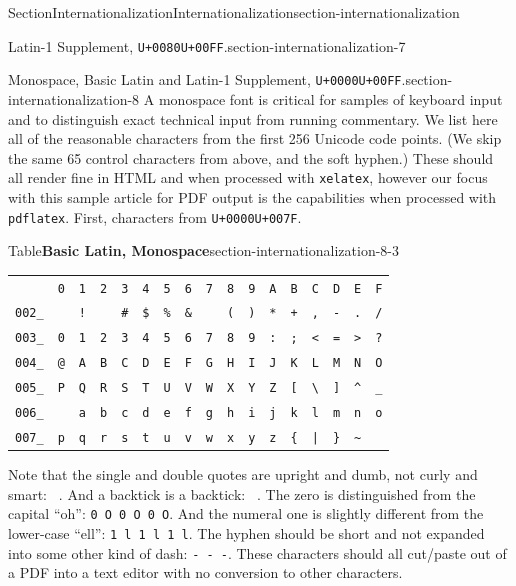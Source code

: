\documentclass[twoside,10pt,]{article}
\newcommand{\tabularfont}{\relax}
\newcommand{\mono}[1]{\texttt{#1}}
\numberwithin{equation}{section}
\begin{document}
\begin{sectionptx}{Section}{Internationalization}{}{Internationalization}{}{}{section-internationalization}
\begin{paragraphs}{Latin-1 Supplement, \mono{U+0080}\textendash{}\mono{U+00FF}.}{section-internationalization-7}
\end{paragraphs}%
\begin{paragraphs}{Monospace, Basic Latin and Latin-1 Supplement, \mono{U+0000}\textendash{}\mono{U+00FF}.}{section-internationalization-8}%
A monospace font is critical for samples of keyboard input and to distinguish exact technical input from running commentary.  We list here all of the reasonable characters from the first 256 Unicode code points.  (We skip the same 65 control characters from above, and the soft hyphen.)  These should all render fine in HTML and when processed with \mono{xelatex}, however our focus with this sample article for PDF output is the capabilities when processed with \mono{pdflatex}.  First, characters from \mono{U+0000}\textendash{}\mono{U+007F}.%
\begin{tableptx}{Table}{\textbf{Basic Latin, Monospace}}{section-internationalization-8-3}{}%
\centering%
{\tabularfont%
\begin{tabular}{lllllllllllllllll}
&\mono{0}&\mono{1}&\mono{2}&\mono{3}&\mono{4}&\mono{5}&\mono{6}&\mono{7}&\mono{8}&\mono{9}&\mono{A}&\mono{B}&\mono{C}&\mono{D}&\mono{E}&\mono{F}\tabularnewline[0pt]
\mono{002\_}&\mono{ }&\mono{!}&\mono{\textquotedbl{}}&\mono{\#}&\mono{\$}&\mono{\%}&\mono{\&}&\mono{\textquotesingle{}}&\mono{(}&\mono{)}&\mono{*}&\mono{+}&\mono{,}&\mono{-}&\mono{.}&\mono{/}\tabularnewline[0pt]
\mono{003\_}&\mono{0}&\mono{1}&\mono{2}&\mono{3}&\mono{4}&\mono{5}&\mono{6}&\mono{7}&\mono{8}&\mono{9}&\mono{:}&\mono{;}&\mono{<}&\mono{=}&\mono{>}&\mono{?}\tabularnewline[0pt]
\mono{004\_}&\mono{@}&\mono{A}&\mono{B}&\mono{C}&\mono{D}&\mono{E}&\mono{F}&\mono{G}&\mono{H}&\mono{I}&\mono{J}&\mono{K}&\mono{L}&\mono{M}&\mono{N}&\mono{O}\tabularnewline[0pt]
\mono{005\_}&\mono{P}&\mono{Q}&\mono{R}&\mono{S}&\mono{T}&\mono{U}&\mono{V}&\mono{W}&\mono{X}&\mono{Y}&\mono{Z}&\mono{[}&\mono{\textbackslash{}}&\mono{]}&\mono{\textasciicircum{}}&\mono{\_}\tabularnewline[0pt]
\mono{006\_}&\mono{\textasciigrave{}}&\mono{a}&\mono{b}&\mono{c}&\mono{d}&\mono{e}&\mono{f}&\mono{g}&\mono{h}&\mono{i}&\mono{j}&\mono{k}&\mono{l}&\mono{m}&\mono{n}&\mono{o}\tabularnewline[0pt]
\mono{007\_}&\mono{p}&\mono{q}&\mono{r}&\mono{s}&\mono{t}&\mono{u}&\mono{v}&\mono{w}&\mono{x}&\mono{y}&\mono{z}&\mono{\{}&\mono{|}&\mono{\}}&\mono{\textasciitilde{}}&
\end{tabular}
}%
\end{tableptx}%
Note that the single and double quotes are upright and dumb, not curly and smart: \mono{\textquotesingle{} \textquotedbl{} \textquotesingle{} \textquotedbl{} \textquotesingle{} \textquotedbl{}}.  And a backtick is a backtick: \mono{\textasciigrave{} \textasciigrave{} \textasciigrave{}}.  The zero is distinguished from the capital ``oh'': \mono{0 O 0 O 0 O}.  And the numeral one is slightly different from the lower-case ``ell'': \mono{1 l 1 l 1 l}.  The hyphen should be short and not expanded into some other kind of dash: \mono{- - -}.  These characters should all cut\slash{}paste out of a PDF into a text editor with no conversion to other characters.%

\end{paragraphs}
\end{sectionptx}
\end{document}
